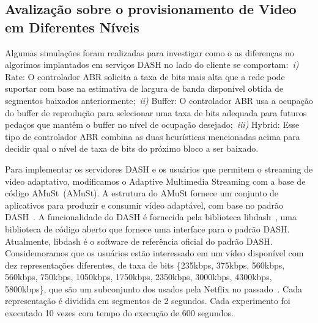 \subsection{Avalização sobre o provisionamento de Video em Diferentes Níveis}
\label{subsec:evaluation}

Algumas simulações foram realizadas para investigar como o as diferenças no algorimos implantados em serviços DASH no lado do cliente se comportam:~\textit{i)} Rate: O controlador ABR solicita a taxa de bits mais alta
que a rede pode suportar com base na estimativa de largura de banda disponível obtida de segmentos baixados anteriormente;~\textit{ii)} Buffer: O controlador ABR usa a ocupação do buffer de reprodução para selecionar uma taxa de bits adequada para futuros pedaços que mantêm o buffer no nível de ocupação desejado;~\textit{iii)} Hybrid: Esse tipo de controlador ABR combina as duas heurísticas mencionadas acima para decidir qual o nível de taxa de bits do próximo bloco a ser baixado.
 


Para implementar os servidores DASH e os usuários que permitem o streaming de video adaptativo, modificamos o  Adaptive Multimedia Streaming com a base de código AMuSt~(AMuSt). 
A estrutura do AMuSt fornece um conjunto de aplicativos para produzir e consumir vídeo adaptável, com base no padrão DASH~\cite{kreuzberger2016amust}. A funcionalidade do DASH é fornecida pela biblioteca libdash~\cite{mueller2013ICMEW}, uma biblioteca de código aberto que fornece uma interface para o padrão DASH. Atualmente, libdash é o software de referência oficial do padrão DASH.
Considemoramos que os usuários estão interessado em um vídeo disponível com dez representações diferentes, de taxa de bits \{235kbps, 375kbps, 560kbps, 560kbps, 750kbps, 1050kbps, 1750kbps, 2350kbps, 3000kbps, 4300kbps, 5800kbps\}, que são um subconjunto dos usados pela Netflix no passado~\cite{netflix:representation}.
Cada representação é dividida em segmentos de 2 segundos. Cada experimento foi executado 10 vezes com tempo do execução de 600 segundos.


